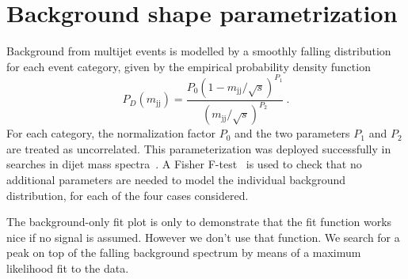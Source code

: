 \section{Background shape parametrization}
\label{sec:background}




Background from multijet events is modelled by a smoothly falling
distribution for each event category, given by the empirical
probability density function
\begin{equation}
P_D(m_\mathrm{jj}) = \frac{P_{0} (1 - m_\mathrm{jj}/\sqrt{s})^{P_{1}}}{(m_\mathrm{jj}/\sqrt{s})^{P_{2}}} \ .
\label{eqParam}
\end{equation}
\noindent For each category, the normalization factor $P_0$ and the
two parameters $P_1$ and $P_2$ are treated as uncorrelated. This
parameterization was deployed successfully in searches in dijet mass
spectra~\cite{cmsdijet}. A Fisher F-test~\cite{Ftest} is used to check
that no additional parameters are needed to model the individual
background distribution, for each of the four cases considered.

The background-only fit plot is only to demonstrate
 that the fit function works nice if no signal is assumed.
 However we don't use that function.
We search for a peak on top of the falling background spectrum by
means of a maximum likelihood fit to the data.

